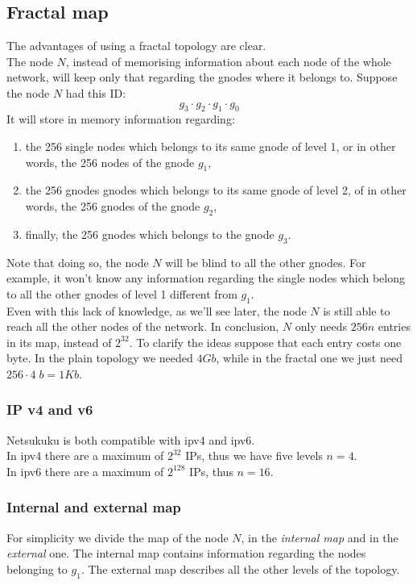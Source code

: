 \documentclass[a4paper]{article}
\begin{document}
\subsection{Fractal map}
The advantages of using a fractal topology are clear.\\
The node $N$, instead of memorising information about each node of the whole
network, will keep only that regarding the gnodes where it belongs to.
Suppose the node $N$ had this ID:
\[
g_3\cdot g_2\cdot g_1\cdot g_0
\]
It will store in memory information regarding:
\begin{enumerate}
	\item the 256 single nodes which belongs to its same gnode of level 1,
		or in other words, the 256 nodes of the gnode $g_1$,
	\item the 256 gnodes gnodes which belongs to its same gnode of level
		2, of in other words, the 256 gnodes of the gnode $g_2$,
	\item finally, the 256 gnodes which belongs to the gnode $g_3$.
\end{enumerate}
Note that doing so, the node $N$ will be blind to all the other gnodes. For
example, it won't know any information regarding the single nodes which belong
to all the other gnodes of level 1 different from $g_1$.\\

Even with this lack of knowledge, as we'll see later, the node $N$ is still
able to reach all the other nodes of the network.
In conclusion, $N$ only needs $256n$ entries in its map, instead of $2^{32}$. 
To clarify the ideas suppose that each entry costs one byte. In the plain
topology we needed $4Gb$, while in the fractal one we just need $256\cdot 4\;
b= 1Kb$.

\subsubsection{IP v4 and v6}
Netsukuku is both compatible with ipv4 and ipv6.\\

In ipv4 there are a maximum of $2^{32}$ IPs, thus we have five levels $n=4$.\\
In ipv6 there are a maximum of $2^{128}$ IPs, thus $n=16$.

\subsubsection{Internal and external map}
For simplicity we divide the map of the node $N$, in the \emph{internal map} and in
the \emph{external} one.  The internal map contains information regarding the
nodes belonging to $g_1$. The external map describes all the other levels of
the topology.
\end{document}
